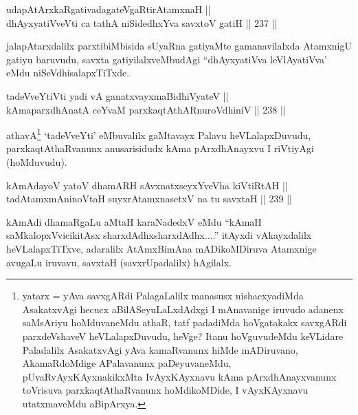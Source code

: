 
\begin{shl}
udapAtArxkaRgativadagateVgaRtirAtamxnaH || \\
dhAyxyatiVveVti ca tathA niSidedhxYva savxtoV gatiH \hfill || 237 ||  
\end{shl}

\begin{artha}
jalapAtarxdalilx parxtibiMbisida sUyaRna gatiyaMte gamanavilalxda
AtamxnigU gatiyu baruvudu, savxta gatiyilalxveMbudAgi ``dhAyxyatiVva
leVlAyatiVva' eMdu niSeVdhisalapxTiTxde.
\end{artha}


\begin{shl}
tadeVveYtiVti yadi vA ganatxvayxmaBidhiVyateV || \\
kAmaparxdhAnatA ceYvaM parxkaqtAthARnuroVdhiniV \hfill || 238 ||  
\end{shl}

\begin{artha}
athavA\footnote{yatarx = yAva savxgARdi PalagaLalilx manasusx
nishacxyadiMda AsakatxvAgi hecucx aBilASeyuLaLxdAdxgi I mAnavanige
iruvudo adanenx saMsAriyu hoMduvaneMdu athaR, tatf padadiMda
hoVgatakakx savxgARdi parxdeVshaveV heVLalapxDuvudu, heVge? Itanu
hoVguvudeMdu keVLidare Paladalilx AsakatxvAgi yAva kamaRvanunx hiMde
mADiruvano, AkamaRdoMdige APalavanunx paDeyuvaneMdu,
pUvaRvAyxKAyxnakikxMta IvAyxKAyxnavu kAma pArxdhAnayxvanunx
toVrisuva parxkaqtAthaRvanunx hoMdikoMDide, I vAyxKAyxnavu
utatxmaveMdu aBipArxya.} `tadeVveYti' eMbuvalilx gaMtavayx Palavu
heVLalapxDuvudu, parxkaqtAthaRvanunx anusarisidudx kAma pArxdhAnayxvu
I riVtiyAgi (hoMduvudu).
\end{artha}

\begin{shl}
kAmAdayoV yatoV dhamARH sAvxnatxseyxYveVha kiVtiRtAH || \\
tadAtamxmAninoV\s taH suyxrAtamxnasetxV na tu savxtaH \hfill || 239 ||  
\end{shl}

\begin{artha}
kAmAdi dhamaRgaLu aMtaH karaNadedxV eMdu ``kAmaH saMkalopxVvicikitAsx
sharxdAdhx\s sharxdAdhx....'' itAyxdi vAkayxdalilx heVLalapxTiTxve,
adaralilx AtAmxBimAna mADikoMDiruva Atamxnige avugaLu iruvavu, savxtaH
(savxrUpadalilx) hAgilalx.
\end{artha}

